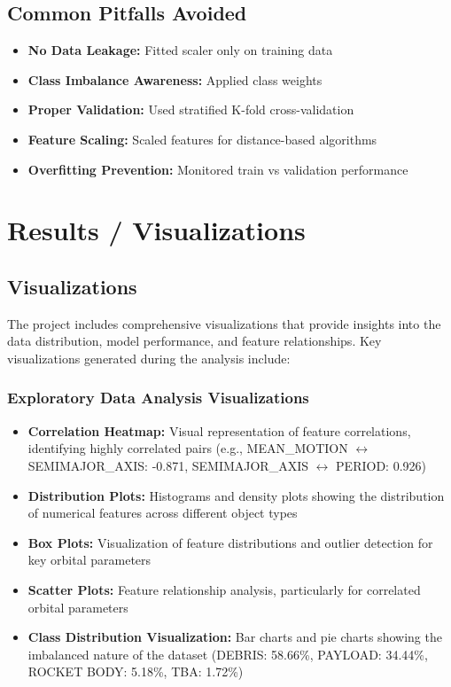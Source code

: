 \documentclass[12pt,a4paper]{article}
\begin{document}
\subsection{Common Pitfalls Avoided}
\begin{itemize}
    \item \checkmark \textbf{No Data Leakage:} Fitted scaler only on training data
    \item \checkmark \textbf{Class Imbalance Awareness:} Applied class weights
    \item \checkmark \textbf{Proper Validation:} Used stratified K-fold cross-validation
    \item \checkmark \textbf{Feature Scaling:} Scaled features for distance-based algorithms
    \item \checkmark \textbf{Overfitting Prevention:} Monitored train vs validation performance
\end{itemize}

\section{Results / Visualizations}

\subsection{Visualizations}
The project includes comprehensive visualizations that provide insights into the data distribution, model performance, and feature relationships. Key visualizations generated during the analysis include:

\subsubsection{Exploratory Data Analysis Visualizations}
\begin{itemize}
    \item \textbf{Correlation Heatmap:} Visual representation of feature correlations, identifying highly correlated pairs (e.g., MEAN\_MOTION $\leftrightarrow$ SEMIMAJOR\_AXIS: -0.871, SEMIMAJOR\_AXIS $\leftrightarrow$ PERIOD: 0.926)
    \item \textbf{Distribution Plots:} Histograms and density plots showing the distribution of numerical features across different object types
    \item \textbf{Box Plots:} Visualization of feature distributions and outlier detection for key orbital parameters
    \item \textbf{Scatter Plots:} Feature relationship analysis, particularly for correlated orbital parameters
    \item \textbf{Class Distribution Visualization:} Bar charts and pie charts showing the imbalanced nature of the dataset (DEBRIS: 58.66\%, PAYLOAD: 34.44\%, ROCKET BODY: 5.18\%, TBA: 1.72\%)
\end{itemize}
\end{document}
